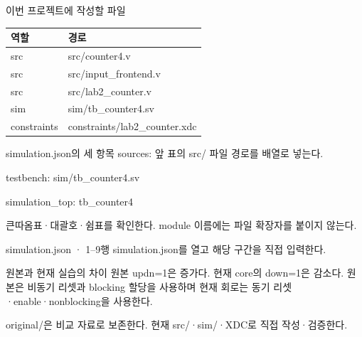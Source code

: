 \begin{frame}{이번 프로젝트에 작성할 파일}
\small
\begin{center}\renewcommand{\arraystretch}{1.55}\begin{tabular}{ll}
역할 & 경로\\\hline
src & src/counter4.v\\
src & src/input\_frontend.v\\
src & src/lab2\_counter.v\\
sim & sim/tb\_counter4.sv\\
constraints & constraints/lab2\_counter.xdc\\
\end{tabular}\end{center}
\end{frame}

\begin{frame}{simulation.json의 세 항목}
\small
sources: 앞 표의 src/ 파일 경로를 배열로 넣는다.\par\vspace{0.26cm}testbench: sim/tb\_counter4.sv\par\vspace{0.26cm}simulation\_top: tb\_counter4\par\vspace{0.26cm}큰따옴표·대괄호·쉼표를 확인한다. module 이름에는 파일 확장자를 붙이지 않는다.\par
\end{frame}

\begin{frame}{simulation.json · 1–9행}
\small
simulation.json를 열고 해당 구간을 직접 입력한다.\par\vspace{0.4cm}\par\vspace{0.4cm}
\end{frame}

\begin{frame}{원본과 현재 실습의 차이}
\small
원본 updn=1은 증가다. 현재 core의 down=1은 감소다. 원본은 비동기 리셋과 blocking 할당을 사용하며 현재 회로는 동기 리셋·enable·nonblocking을 사용한다.\par\vspace{0.26cm}original/은 비교 자료로 보존한다. 현재 src/·sim/·XDC로 직접 작성·검증한다.\par
\end{frame}

